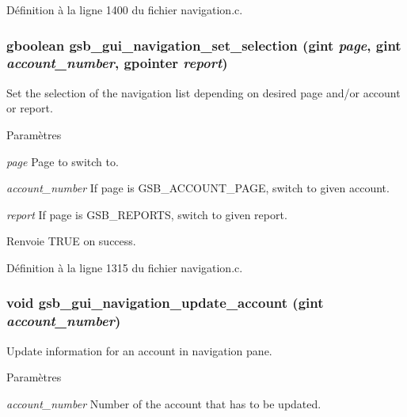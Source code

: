 Définition à la ligne 1400 du fichier navigation.c.

\subsubsection[{gsb\_\-gui\_\-navigation\_\-set\_\-selection}]{\setlength{\rightskip}{0pt plus 5cm}gboolean gsb\_\-gui\_\-navigation\_\-set\_\-selection (gint {\em page}, \/  gint {\em account\_\-number}, \/  gpointer {\em report})}\label{navigation_8c_a3fb9bd34026d724eefe1309fb63bf8fc}
Set the selection of the navigation list depending on desired page and/or account or report.


\begin{DoxyParams}{Paramètres}
\item[{\em page}]Page to switch to. \item[{\em account\_\-number}]If page is GSB\_\-ACCOUNT\_\-PAGE, switch to given account. \item[{\em report}]If page is GSB\_\-REPORTS, switch to given report.\end{DoxyParams}
\begin{DoxyReturn}{Renvoie}
TRUE on success. 
\end{DoxyReturn}


Définition à la ligne 1315 du fichier navigation.c.

\subsubsection[{gsb\_\-gui\_\-navigation\_\-update\_\-account}]{\setlength{\rightskip}{0pt plus 5cm}void gsb\_\-gui\_\-navigation\_\-update\_\-account (gint {\em account\_\-number})}\label{navigation_8c_adcd317bee4b886a4eafb93112f65042e}
Update information for an account in navigation pane.


\begin{DoxyParams}{Paramètres}
\item[{\em account\_\-number}]Number of the account that has to be updated. \end{DoxyParams}


